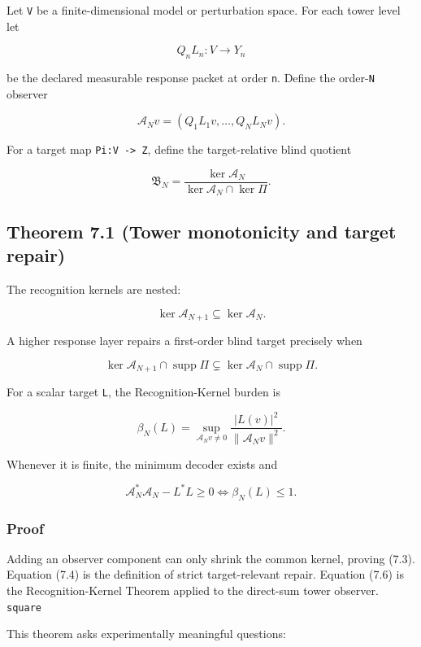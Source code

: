Let \texttt{V} be a finite-dimensional model or perturbation space. For each tower
level let

\[
Q_nL_n:V\longrightarrow Y_n
\]

be the declared measurable response packet at order \texttt{n}. Define the order-\texttt{N}
observer

\[
\boxed{
\mathcal A_Nv
=
(Q_1L_1v,\ldots,Q_NL_Nv).
}
\tag{7.1}
\]

For a target map \texttt{Pi:V\ -\textgreater{}\ Z}, define the target-relative blind quotient

\[
\boxed{
\mathfrak B_N
=
\frac{\ker\mathcal A_N}
{\ker\mathcal A_N\cap\ker\Pi}.
}
\tag{7.2}
\]

\hypertarget{theorem-7.1-tower-monotonicity-and-target-repair}{%
\subsection{Theorem 7.1 (Tower monotonicity and target repair)}\label{theorem-7.1-tower-monotonicity-and-target-repair}}

The recognition kernels are nested:

\[
\boxed{
\ker\mathcal A_{N+1}
\subseteq
\ker\mathcal A_N.
}
\tag{7.3}
\]

A higher response layer repairs a first-order blind target precisely when

\[
\ker\mathcal A_{N+1}\cap\operatorname{supp}\Pi
\subsetneq
\ker\mathcal A_N\cap\operatorname{supp}\Pi.
\tag{7.4}
\]

For a scalar target \texttt{L}, the Recognition-Kernel burden is

\[
\beta_N(L)
=
\sup_{\mathcal A_Nv\ne0}
\frac{|L(v)|^2}{\|\mathcal A_Nv\|^2}.
\tag{7.5}
\]

Whenever it is finite, the minimum decoder exists and

\[
\mathcal A_N^*\mathcal A_N-L^*L\ge0
\iff
\beta_N(L)\le1.
\tag{7.6}
\]

\hypertarget{proof-4}{%
\subsubsection{Proof}\label{proof-4}}

Adding an observer component can only shrink the common kernel, proving (7.3).
Equation (7.4) is the definition of strict target-relevant repair. Equation
(7.6) is the Recognition-Kernel Theorem applied to the direct-sum tower
observer. \texttt{square}

This theorem asks experimentally meaningful questions:

